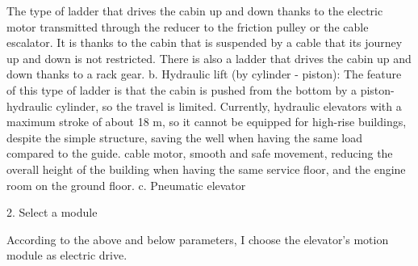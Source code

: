The type of ladder that drives the cabin up and down thanks to the electric motor transmitted through the reducer to the friction pulley or the cable escalator. It is thanks to the cabin that is suspended by a cable that its journey up and down is not restricted. There is also a ladder that drives the cabin up and down thanks to a rack gear.
b. Hydraulic lift (by cylinder - piston):
The feature of this type of ladder is that the cabin is pushed from the bottom by a piston-hydraulic cylinder, so the travel is limited. Currently, hydraulic elevators with a maximum stroke of about 18 m, so it cannot be equipped for high-rise buildings, despite the simple structure, saving the well when having the same load compared to the guide. cable motor, smooth and safe movement, reducing the overall height of the building when having the same service floor, and the engine room on the ground floor.
c. Pneumatic elevator

2.  Select a module

According to the above and below parameters, I choose the elevator's motion module as electric drive.
\newpage


